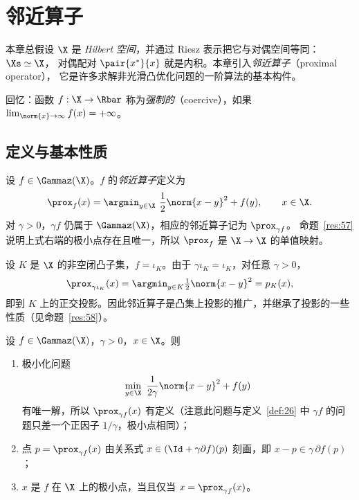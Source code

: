 \chapter{邻近算子}
\label{ch:ch04}
\providecommand{\Fix}{\operatorname{Fix}}

本章总假设 $\X$ 是 \emph{Hilbert 空间}，并通过 Riesz 表示把它与对偶空间等同：$\Xs\simeq\X$，
对偶配对 $\pair{x^*}{x}$ 就是内积。本章引入\emph{邻近算子}（proximal operator），
它是许多求解非光滑凸优化问题的一阶算法的基本构件。

回忆：函数 $f:\X\to\Rbar$ 称为\emph{强制的}（coercive），如果 $\lim_{\norm{x}\to\infty}f(x)=+\infty$。

\section{定义与基本性质}

\begin{definition}[邻近算子]
\label{def:26}
设 $f\in\Gammaz(\X)$。$f$ 的\emph{邻近算子}定义为
\[
  \prox_f(x)=\argmin_{y\in\X}\ \frac12\norm{x-y}^2+f(y),\qquad x\in\X .
\]
对 $\gamma>0$，$\gamma f$ 仍属于 $\Gammaz(\X)$，相应的邻近算子记为 $\prox_{\gamma f}$。
命题~\ref{res:57} 说明上式右端的极小点存在且唯一，所以 $\prox_f$ 是 $\X\to\X$ 的单值映射。
\end{definition}

\begin{example}[投影]
\label{exa:18}
设 $K$ 是 $\X$ 的非空闭凸子集，$f=\iota_K$。由于 $\gamma\iota_K=\iota_K$，对任意 $\gamma>0$，
\[
  \prox_{\gamma\iota_K}(x)=\argmin_{y\in K}\tfrac12\norm{x-y}^2=p_K(x),
\]
即到 $K$ 上的正交投影。因此邻近算子是凸集上投影的推广，并继承了投影的一些性质（见命题~\ref{res:58}）。
\end{example}

\begin{proposition}
\label{res:57}
设 $f\in\Gammaz(\X)$，$\gamma>0$，$x\in\X$。则
\begin{enumerate}[label=(\roman*)]
  \item 极小化问题
  \[
    \min_{y\in\X}\ \frac1{2\gamma}\norm{x-y}^2+f(y)
  \]
  有唯一解，所以 $\prox_{\gamma f}(x)$ 有定义（注意此问题与定义~\ref{def:26} 中 $\gamma f$ 的问题只差一个正因子 $1/\gamma$，极小点相同）；
  \item 点 $p=\prox_{\gamma f}(x)$ 由关系式 $x\in(\Id+\gamma\partial f)(p)$ 刻画，即 $x-p\in\gamma\,\partial f(p)$；
  \item $x$ 是 $f$ 在 $\X$ 上的极小点，当且仅当 $x=\prox_{\gamma f}(x)$。
\end{enumerate}
\end{proposition}

